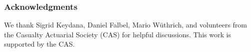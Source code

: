 \documentclass{article}
\begin{document}
\subsubsection*{Acknowledgments}

We thank Sigrid Keydana, Daniel Falbel, Mario Wüthrich, and volunteers from the
Casualty Actuarial Society (CAS) for helpful discussions. This work is supported
by the CAS.









% 
% 
% 
\end{document}
